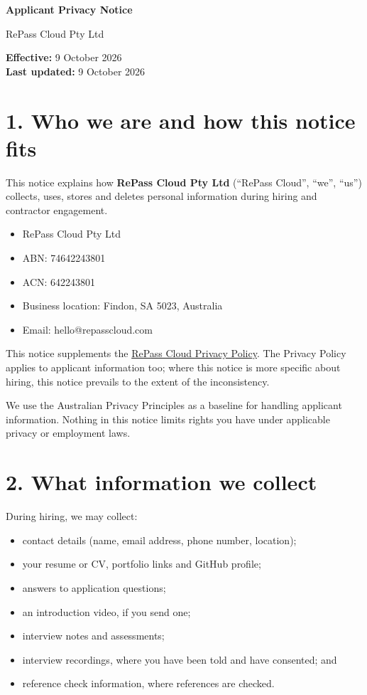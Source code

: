 \documentclass[11pt]{article}
\providecommand{\tightlist}{\setlength{\itemsep}{0pt}\setlength{\parskip}{0pt}}
\begin{document}
{\LARGE \textbf{Applicant Privacy Notice}}

\vspace{4pt}
RePass Cloud Pty Ltd

\vspace{12pt}

\textbf{Effective:} 9 October 2026\\
\textbf{Last updated:} 9 October 2026

\section*{1. Who we are and how this notice fits}

This notice explains how \textbf{RePass Cloud Pty Ltd} (``RePass Cloud'', ``we'', ``us'') collects, uses, stores and deletes personal information during hiring and contractor engagement.

\begin{itemize}
\tightlist
\item
  RePass Cloud Pty Ltd
\item
  ABN: 74642243801
\item
  ACN: 642243801
\item
  Business location: Findon, SA 5023, Australia
\item
  Email: hello@repasscloud.com
\end{itemize}

This notice supplements the \href{https://repasscloud.com/legal/privacy-policy/}{RePass Cloud Privacy Policy}. The Privacy Policy applies to applicant information too; where this notice is more specific about hiring, this notice prevails to the extent of the inconsistency.

We use the Australian Privacy Principles as a baseline for handling applicant information. Nothing in this notice limits rights you have under applicable privacy or employment laws.

\section*{2. What information we collect}

During hiring, we may collect:

\begin{itemize}
\tightlist
\item
  contact details (name, email address, phone number, location);
\item
  your resume or CV, portfolio links and GitHub profile;
\item
  answers to application questions;
\item
  an introduction video, if you send one;
\item
  interview notes and assessments;
\item
  interview recordings, where you have been told and have consented; and
\item
  reference check information, where references are checked.
\end{itemize}
\end{document}
